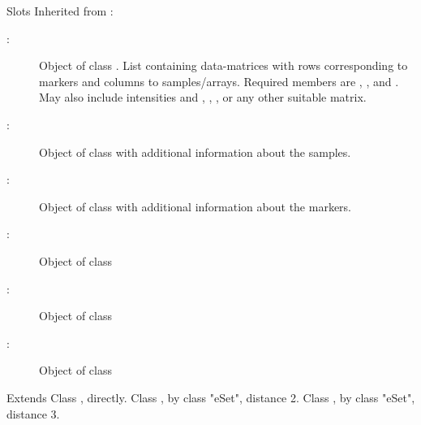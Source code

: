 \documentclass[letterpaper]{book}
\begin{document}
\begin{Section}{Slots}
Inherited from :
\begin{description}

\item[:] Object of class . List
containing data-matrices with rows corresponding to markers and
columns to samples/arrays. Required members are ,
, and . May also include intensities 
and , , , or any other
suitable matrix.
\item[:] Object of class
 with additional information about the
samples.
\item[:] Object of class
 with additional information about the markers.
\item[:] Object of class 
\item[:] Object of class 
\item[:] Object of class 

\end{description}

\end{Section}
%
\begin{Section}{Extends}
Class , directly.
Class , by class "eSet", distance 2.
Class , by class "eSet", distance 3.
\end{Section}
%
\end{document}
